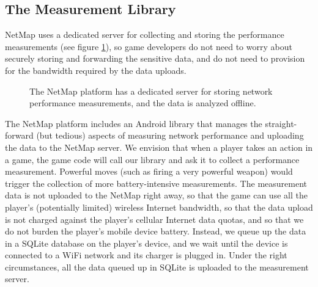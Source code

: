 \subsection{The Measurement Library}
\label{ss:dataflow}

NetMap uses a dedicated server for collecting and storing the performance
measurements (see figure \ref{fig:servers}), so game developers do not need to
worry about securely storing and forwarding the sensitive data, and do not need
to provision for the bandwidth required by the data uploads.

\begin{figure}[hbtp]
  \caption{
    The NetMap platform has a dedicated server for storing network
    performance measurements, and the data is analyzed offline.
  }
  \label{fig:servers}
\end{figure}

The NetMap platform includes an Android library that manages the
straight-forward (but tedious) aspects of measuring network performance and
uploading the data to the NetMap server. We envision that when a player takes
an action in a game, the game code will call our library and ask it to collect
a performance measurement. Powerful moves (such as firing a very powerful
weapon) would trigger the collection of more battery-intensive measurements.
The measurement data is not uploaded to the NetMap
right away, so that the game can use all the player's (potentially limited)
wireless Internet bandwidth, so that the data upload is not charged against
the player's cellular Internet data quotas, and so that we do not burden the
player's mobile device battery. Instead, we queue up the data in a SQLite
database on the player's device, and we wait until the device is connected to a
WiFi network and its charger is plugged in. Under the right circumstances, all
the data queued up in SQLite is uploaded to the measurement server.


